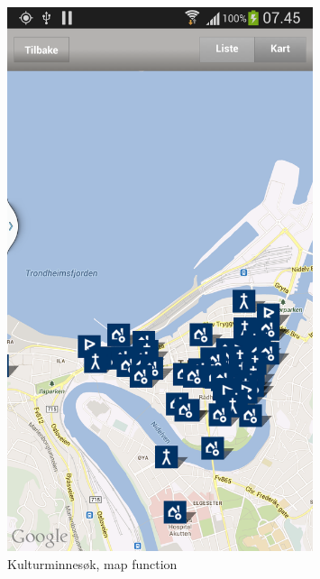 \documentclass[11pt]{book}
\begin{document}
\begin{figure}[H]
      \centering
      \includegraphics[width=0.8\textwidth]{Figures/Prestudy/kulturSokMap.png}
      \caption{Kulturminnesøk, map function}
      \label{fig:pre_kulturMinneAppMap}
\end{figure}
\end{document}

